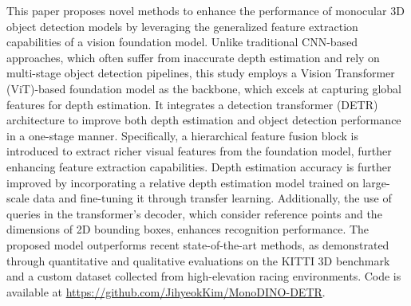 This paper proposes novel methods to enhance the performance of monocular 3D object detection models by leveraging the generalized feature extraction capabilities of a vision foundation model. Unlike traditional CNN-based approaches, which often suffer from inaccurate depth estimation and rely on multi-stage object detection pipelines, this study employs a Vision Transformer (ViT)-based foundation model as the backbone, which excels at capturing global features for depth estimation. It integrates a detection transformer (DETR) architecture to improve both depth estimation and object detection performance in a one-stage manner. Specifically, a hierarchical feature fusion block is introduced to extract richer visual features from the foundation model, further enhancing feature extraction capabilities. Depth estimation accuracy is further improved by incorporating a relative depth estimation model trained on large-scale data and fine-tuning it through transfer learning. Additionally, the use of queries in the transformer's decoder, which consider reference points and the dimensions of 2D bounding boxes, enhances recognition performance. The proposed model outperforms recent state-of-the-art methods, as demonstrated through quantitative and qualitative evaluations on the KITTI 3D benchmark and a custom dataset collected from high-elevation racing environments. Code is
available at \url{https://github.com/JihyeokKim/MonoDINO-DETR}.
